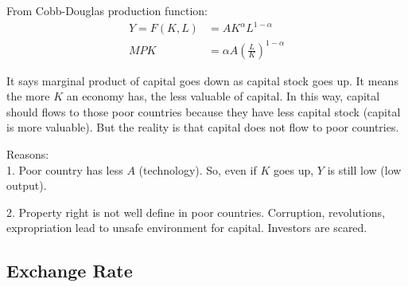 \documentclass[12pt]{article}
\begin{document}
From Cobb-Douglas production function:
\begin{align*}
Y = F(K,L) &= AK^{\alpha}L^{1 - \alpha}\\
MPK &= \alpha A \left( \frac{L}{K} \right) ^{1 - \alpha}
\end{align*}

It says marginal product of capital goes down as capital stock goes up.
It means the more $ K $ an economy has, the less valuable of capital.
In this way, capital should flows to those poor countries because they have less
capital stock (capital is more valuable). But the reality is that capital does not
flow to poor countries.

Reasons:\\
1. Poor country has less $ A $ (technology). So, even if $ K $ goes up, $ Y $
is still low (low output).

2. Property right is not well define in poor countries. Corruption, revolutions, 
expropriation lead to unsafe environment for capital. Investors are scared.








\subsection{Exchange Rate}











%
%
\end{document}
